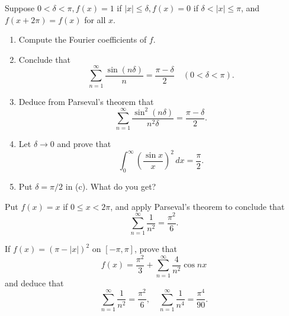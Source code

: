   \begin{exercise}[Rudin 8.12]
    Suppose $0 < \delta < \pi, f(x) = 1$ if $|x| \leq \delta, f(x) = 0$ if $\delta < |x| \leq \pi$, and $f(x + 2\pi) = f(x)$ for all $x$.
    \begin{enumerate}
      \item Compute the Fourier coefficients of $f$.
      \item Conclude that
        \begin{equation}
          \sum_{n=1}^\infty \frac{\sin (n\delta)}{n} = \frac{\pi - \delta}{2} \quad (0 < \delta < \pi).
        \end{equation}
      \item Deduce from Parseval's theorem that
        \begin{equation}
          \sum_{n=1}^\infty \frac{\sin^2 (n\delta)}{n^2 \delta} = \frac{\pi - \delta}{2}.
        \end{equation}
      \item Let $\delta \to 0$ and prove that
        \begin{equation}
          \int_0^\infty \left( \frac{\sin x}{x} \right)^2 \, dx = \frac{\pi}{2}.
        \end{equation}
      \item Put $\delta = \pi/2$ in (c). What do you get?
    \end{enumerate}
  \end{exercise}
  \begin{solution}

  \end{solution}

  \begin{exercise}[Rudin 8.13]
    Put $f(x) = x$ if $0 \leq x < 2\pi$, and apply Parseval's theorem to conclude that
    \begin{equation}
      \sum_{n=1}^\infty \frac{1}{n^2} = \frac{\pi^2}{6}.
    \end{equation}
  \end{exercise}
  \begin{solution}

  \end{solution}

  \begin{exercise}[Rudin 8.14]
    If $f(x) = (\pi - |x|)^2$ on $[-\pi, \pi]$, prove that
    \begin{equation}
      f(x) = \frac{\pi^2}{3} + \sum_{n=1}^\infty \frac{4}{n^2} \cos nx
    \end{equation}
    and deduce that
    \begin{equation}
      \sum_{n=1}^\infty \frac{1}{n^2} = \frac{\pi^2}{6}, \quad \sum_{n=1}^\infty \frac{1}{n^4} = \frac{\pi^4}{90}.
    \end{equation}
  \end{exercise}
  \begin{solution}

  \end{solution}

